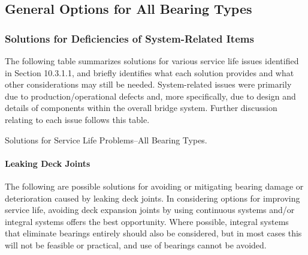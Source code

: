 \subsection{General Options for All Bearing Types}
\subsubsection{Solutions for Deficiencies of System-Related Items}
The following table summarizes solutions for various service life issues identified in Section 10.3.1.1, and briefly identifies what each solution provides and what other considerations may still be needed. System-related issues were primarily due to production/operational defects and, more specifically, due to design and details of components within the overall bridge system. Further discussion relating to each issue follows this table.

\begin{table}
  \caption{Solutions for Service Life Problems–All Bearing Types.}
  \label{tab:solution-all-bearing}
\end{table}


\paragraph{Leaking Deck Joints}
The following are possible solutions for avoiding or mitigating bearing damage or deterioration caused by
leaking deck joints. In considering options for improving service life, avoiding deck expansion joints by using
continuous systems and/or integral systems offers the best opportunity. Where possible, integral systems that
eliminate bearings entirely should also be considered, but in most cases this will not be feasible or practical, and use
of bearings cannot be avoided.

